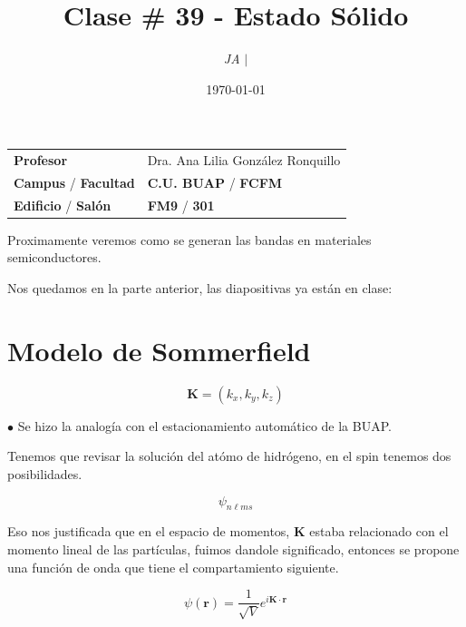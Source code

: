 \documentclass{article}
\title{Clase \# 39 - Estado Sólido}
\author{\emph{JA} $\boldsymbol{\mid}$}
\date{\today}
\begin{document}
\maketitle



\begin{mybox}
\noindent\begin{tabular}{@{}ll}
	{\bfseries{Profesor}} & Dra. Ana Lilia González Ronquillo\\
	\textcolor{prussianblue}{\bfseries{Campus}} / \textcolor{trueblue}{\bfseries{Facultad}}  & \textcolor{prussianblue}{\bfseries{C.U. BUAP}} /  \textcolor{trueblue}{\bfseries{FCFM}} \\
	\textcolor{prussianblue}{\bfseries{Edificio}} /  \textcolor{trueblue}{\bfseries{Salón}}    & 	\textcolor{prussianblue}{\bfseries{FM9}} /  \textcolor{trueblue}{\bfseries{301}}   
\end{tabular} 
\end{mybox} \vspace{1cm}

\tableofcontents

\vspace{2cm}


Proximamente veremos como se generan las bandas en materiales semiconductores. 

Nos quedamos en la parte anterior, las diapositivas ya están en clase:

\section{Modelo de Sommerfield}


\[ \boldsymbol{K} = (k_{x},k_{y},k_{z})  \]




$\bullet$ Se hizo la analogía con el estacionamiento automático de la BUAP.


Tenemos que revisar la solución del atómo de hidrógeno, en el spin tenemos dos posibilidades. 


\[ \psi_{n\ell m s} \]


Eso nos justificada que en el espacio de momentos, $\boldsymbol{K}$ estaba relacionado con el momento lineal de las partículas, fuimos dandole significado, entonces se propone una función de onda que tiene el compartamiento siguiente.


\[  \psi(\boldsymbol{r}) = \frac{1}{\sqrt{V}} e^{i\boldsymbol{K} \cdot \boldsymbol{r}}    \]
\end{document}
